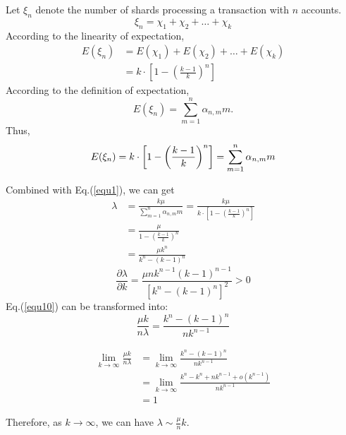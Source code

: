 \documentclass[10pt, conference, letterpaper]{IEEEtran}
\begin{document}
Let $\xi_n$ denote the number of shards processing  a transaction with $n$ accounts.		
\begin{equation}
	\xi_n= \chi_1+ \chi_2+\dots+ \chi_k
\end{equation}
According to the linearity of expectation,  
\begin{equation}
	\begin{split}
		E(\xi_n)&=E( \chi_1)+E( \chi_2)+\dots+E( \chi_k)  \\
		&= k\cdot \left[1-\left(\frac{k-1}{k}\right)^n\right]
	\end{split}
\end{equation}
According to the definition of expectation,
\begin{equation}
	E(\xi_n)=\sum_{m=1}^n  \alpha_{n,m}m.
\end{equation}
Thus, 
\begin{equation}
	E(\xi_n)= k\cdot \left[1-\left(\frac{k-1}{k}\right)^n\right]=\sum_{m=1}^n  \alpha_{n,m}m  \\
\end{equation}

Combined with 	Eq.(\ref{equ1}), we can get 
\begin{equation} \label{equ10}
	\begin{split}
		\lambda&=\frac{k\mu}{\sum_{m=1}^n  \alpha_{n,m}m } = \frac{k\mu}{k\cdot \left[1-\left(\frac{k-1}{k}\right)^n\right]}\\
		&=\frac{\mu}{1-\left(\frac{k-1}{k}\right)^n}\\
		&=\frac{\mu k^n}{k^n-(k-1)^n}
	\end{split}
\end{equation}
\begin{equation}  
	\frac{	\partial \lambda}{	\partial k}
	=\frac{\mu n k^{n-1} (k-1)^{n-1} }{\left[k^n-(k-1)^n\right]^2}
	>0
\end{equation}
Eq.(\ref{equ10}) can be transformed into:
\begin{equation}
	\frac{\mu k}{n \lambda}=  \frac{k^n-(k-1)^n}{n k^{n-1}}
\end{equation}

\begin{equation} \label{equ12}
	\begin{split}
		\lim_{k\rightarrow \infty} \frac{\mu k}{n \lambda}&=  \lim_{k\rightarrow \infty} \frac{k^n-(k-1)^n}{n k^{n-1}} \\
		&=\lim_{k\rightarrow \infty}  \frac{k^n-k^n+n k^{n-1}+o(k^{n-1})}{n k^{n-1}} \\
		&= 1
	\end{split}
\end{equation}

Therefore, as $ k \rightarrow \infty$, we can have $\lambda \sim \frac{\mu }{n}k $.
\end{document}
